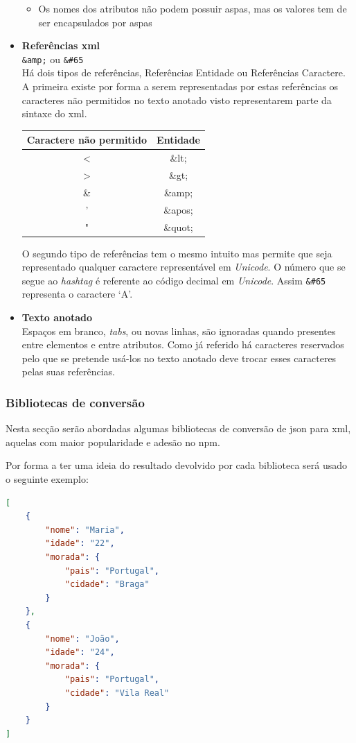 \begin{itemize}
\begin{itemize}
        \item Os nomes dos atributos não podem possuir aspas, mas os valores tem de ser encapsulados por aspas
    \end{itemize}
    \item \textbf{Referências \acrshort{xml}} \\
    \verb|&amp;| ou \verb|&#65| \\
    Há dois tipos de referências, Referências Entidade ou Referências Caractere. A primeira existe por forma a serem representadas por estas referências os caracteres não permitidos no texto anotado visto representarem parte da sintaxe do \acrshort{xml}.
    \begin{center}
        \begin{tabular}{|c|c|}
            \hline
            Caractere não permitido & Entidade \\ \hline
            < & \&lt; \\ \hline
            > & \&gt; \\ \hline
            \& & \&amp; \\ \hline
            ' & \&apos; \\ \hline
            " & \&quot; \\ \hline
        \end{tabular}
    \end{center}
    O segundo tipo de referências tem o mesmo intuito mas permite que seja representado qualquer caractere representável em \textit{Unicode}. O número que se segue ao \textit{hashtag} é referente ao código decimal em \textit{Unicode}. Assim \verb|&#65| representa o caractere `A'.
    \item \textbf{Texto anotado} \\
    Espaços em branco, \textit{tabs}, ou novas linhas, são ignoradas quando presentes entre elementos e entre atributos. Como já referido há caracteres reservados pelo que se pretende usá-los no texto anotado deve trocar esses caracteres pelas suas referências.
\end{itemize}

\subsubsection{Bibliotecas de conversão}

Nesta secção serão abordadas algumas bibliotecas de conversão de \acrshort{json} para \acrshort{xml}, aquelas com maior popularidade e adesão no \acrshort{npm}.

Por forma a ter uma ideia do resultado devolvido por cada biblioteca será usado o seguinte exemplo:
\begin{lstlisting}[language=json, caption=Exemplo em \acrshort{json} a converter, label=exem:jsonBib]
[
    {
        "nome": "Maria",
        "idade": "22",
        "morada": {
            "pais": "Portugal",
            "cidade": "Braga"
        }
    },
    {
        "nome": "João",
        "idade": "24",
        "morada": {
            "pais": "Portugal",
            "cidade": "Vila Real"
        }
    }
]
\end{lstlisting}

